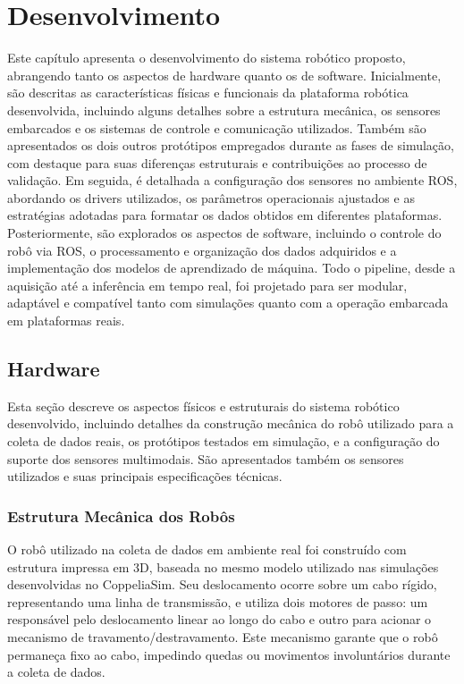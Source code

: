 
\chapter{Desenvolvimento}
\label{cap:trabalhos:desenvolvimento}

Este capítulo apresenta o desenvolvimento do sistema robótico proposto, abrangendo tanto os aspectos de hardware quanto os de software. Inicialmente, são descritas as características físicas e funcionais da plataforma robótica desenvolvida, incluindo alguns detalhes sobre a estrutura mecânica, os sensores embarcados e os sistemas de controle e comunicação utilizados. Também são apresentados os dois outros protótipos empregados durante as fases de simulação, com destaque para suas diferenças estruturais e contribuições ao processo de validação. Em seguida, é detalhada a configuração dos sensores no ambiente ROS, abordando os drivers utilizados, os parâmetros operacionais ajustados e as estratégias adotadas para formatar os dados obtidos em diferentes plataformas. Posteriormente, são explorados os aspectos de software, incluindo o controle do robô via ROS, o processamento e organização dos dados adquiridos e a implementação dos modelos de aprendizado de máquina. Todo o pipeline, desde a aquisição até a inferência em tempo real, foi projetado para ser modular, adaptável e compatível tanto com simulações quanto com a operação embarcada em plataformas reais.

\section{Hardware}

Esta seção descreve os aspectos físicos e estruturais do sistema robótico desenvolvido, incluindo detalhes da construção mecânica do robô utilizado para a coleta de dados reais, os protótipos testados em simulação, e a configuração do suporte dos sensores multimodais. São apresentados também os sensores utilizados e suas principais especificações técnicas.

\subsection{Estrutura Mecânica dos Robôs}

O robô utilizado na coleta de dados em ambiente real foi construído com estrutura impressa em 3D, baseada no mesmo modelo utilizado nas simulações desenvolvidas no CoppeliaSim. Seu deslocamento ocorre sobre um cabo rígido, representando uma linha de transmissão, e utiliza dois motores de passo: um responsável pelo deslocamento linear ao longo do cabo e outro para acionar o mecanismo de travamento/destravamento. Este mecanismo garante que o robô permaneça fixo ao cabo, impedindo quedas ou movimentos involuntários durante a coleta de dados.

